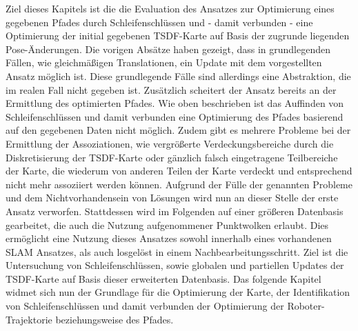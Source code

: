 Ziel dieses Kapitels ist die die Evaluation des Ansatzes zur Optimierung eines gegebenen Pfades durch Schleifenschlüssen und - damit verbunden - eine Optimierung der initial gegebenen TSDF-Karte auf Basis der zugrunde liegenden Pose-Änderungen. Die vorigen Absätze haben gezeigt, dass in grundlegenden Fällen, wie gleichmäßigen Translationen, ein Update mit dem vorgestellten Ansatz möglich ist. Diese grundlegende Fälle sind allerdings eine Abstraktion, die im realen Fall nicht gegeben ist. Zusätzlich scheitert der Ansatz bereits an der Ermittlung des optimierten Pfades. Wie oben beschrieben ist das Auffinden von Schleifenschlüssen und damit verbunden eine Optimierung des Pfades basierend auf den gegebenen Daten nicht möglich. Zudem gibt es mehrere Probleme bei der Ermittlung der Assoziationen, wie vergrößerte Verdeckungsbereiche durch die Diskretisierung der TSDF-Karte oder gänzlich falsch eingetragene Teilbereiche der Karte, die wiederum von anderen Teilen der Karte verdeckt und entsprechend nicht mehr assoziiert werden können. Aufgrund der Fülle der genannten Probleme und dem Nichtvorhandensein von Lösungen wird nun an dieser Stelle der erste Ansatz verworfen. Stattdessen wird im Folgenden auf einer größeren Datenbasis gearbeitet, die auch die Nutzung aufgenommener Punktwolken erlaubt. Dies ermöglicht eine Nutzung dieses Ansatzes sowohl innerhalb eines vorhandenen SLAM Ansatzes, als auch losgelöst in einem Nachbearbeitungsschritt. Ziel ist die Untersuchung von Schleifenschlüssen, sowie globalen und partiellen Updates der TSDF-Karte auf Basis dieser erweiterten Datenbasis. Das folgende Kapitel widmet sich nun der Grundlage für die Optimierung der Karte, der Identifikation von Schleifenschlüssen und damit verbunden der Optimierung der Roboter-Trajektorie beziehungsweise des Pfades.


